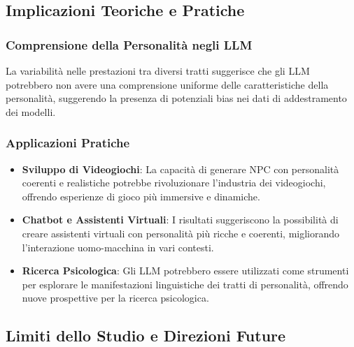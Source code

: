 \subsection{Implicazioni Teoriche e Pratiche}

\subsubsection{Comprensione della Personalità negli LLM}
La variabilità nelle prestazioni tra diversi tratti suggerisce che gli LLM potrebbero non avere una comprensione uniforme delle caratteristiche della personalità, suggerendo la presenza di potenziali bias nei dati di addestramento dei modelli.

\subsubsection{Applicazioni Pratiche}
\begin{itemize}
    \item \textbf{Sviluppo di Videogiochi}: La capacità di generare NPC con personalità coerenti e realistiche potrebbe rivoluzionare l'industria dei videogiochi, offrendo esperienze di gioco più immersive e dinamiche.
    
    \item \textbf{Chatbot e Assistenti Virtuali}: I risultati suggeriscono la possibilità di creare assistenti virtuali con personalità più ricche e coerenti, migliorando l'interazione uomo-macchina in vari contesti.
    
    \item \textbf{Ricerca Psicologica}: Gli LLM potrebbero essere utilizzati come strumenti per esplorare le manifestazioni linguistiche dei tratti di personalità, offrendo nuove prospettive per la ricerca psicologica.
\end{itemize}

\subsection{Limiti dello Studio e Direzioni Future}

